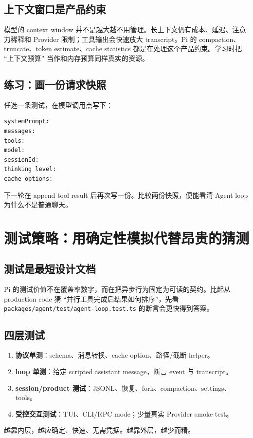 \documentclass[UTF8,openany,11pt]{ctexbook}
\newcommand{\pathref}[1]{\texttt{#1}}
\newcommand{\term}[1]{\textbf{#1}}
\begin{document}
\section{上下文窗口是产品约束}
模型的 context window 并不是越大越不用管理。长上下文仍有成本、延迟、注意力稀释和 Provider 限制；工具输出会快速放大 transcript。Pi 的 compaction、truncate、token estimate、cache statistics 都是在处理这个产品约束。学习时把 ``上下文预算'' 当作和内存预算同样真实的资源。

\section{练习：画一份请求快照}
任选一条测试，在模型调用点写下：
\begin{Verbatim}[fontsize=\small]
systemPrompt:
messages:
tools:
model:
sessionId:
thinking level:
cache options:
\end{Verbatim}
下一轮在 append tool result 后再次写一份。比较两份快照，便能看清 Agent loop 为什么不是普通聊天。

\chapter{测试策略：用确定性模拟代替昂贵的猜测}

\section{测试是最短设计文档}
Pi 的测试价值不在覆盖率数字，而在把异步行为固定为可读的契约。比起从 production code 猜 ``并行工具完成后结果如何排序''，先看 \pathref{packages/agent/test/agent-loop.test.ts} 的断言会更快得到答案。

\section{四层测试}
\begin{enumerate}
\item \term{协议单测}：schema、消息转换、cache option、路径/截断 helper。
\item \term{loop 单测}：给定 scripted assistant message，断言 event 与 transcript。
\item \term{session/product 测试}：JSONL、恢复、fork、compaction、settings、tools。
\item \term{受控交互测试}：TUI、CLI/RPC mode；少量真实 Provider smoke test。
\end{enumerate}
越靠内层，越应确定、快速、无需凭据。越靠外层，越少而精。
\end{document}
